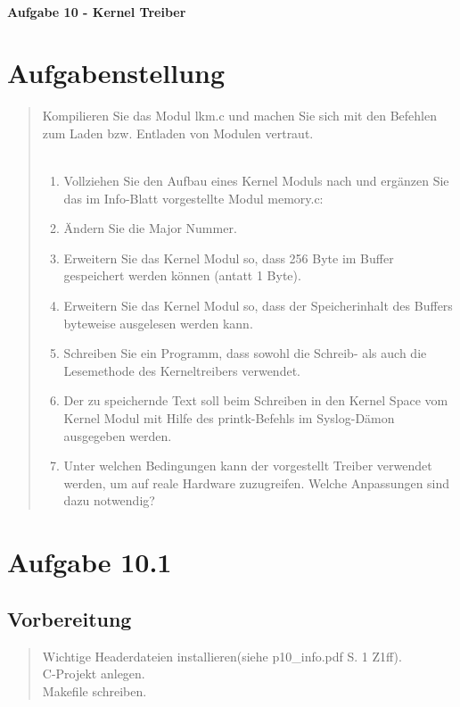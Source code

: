 \newpage

\paragraph{\LARGE Aufgabe 10 - Kernel Treiber}

\section{Aufgabenstellung}
	\begin{quote}
		Kompilieren Sie das Modul lkm.c und machen Sie sich mit den Befehlen zum Laden bzw. Entladen von Modulen vertraut.\\ \\
		\begin{enumerate}
			\item Vollziehen Sie den Aufbau eines Kernel Moduls nach und erg\"anzen Sie das im Info-Blatt vorgestellte Modul memory.c:\\
			\item \"Andern Sie die Major Nummer.\\
			\item Erweitern Sie das Kernel Modul so, dass 256 Byte im Buffer gespeichert werden k\"onnen (antatt 1 Byte).\\
			\item Erweitern Sie das Kernel Modul so, dass der Speicherinhalt des Buffers byteweise ausgelesen werden kann.\\
			\item Schreiben Sie ein Programm, dass sowohl die Schreib- als auch die Lesemethode des Kerneltreibers verwendet.\\
			\item Der zu speichernde Text soll beim Schreiben in den Kernel Space vom Kernel Modul mit Hilfe des printk-Befehls im Syslog-D\"amon ausgegeben werden.\\
			\item Unter welchen Bedingungen kann der vorgestellt Treiber verwendet werden, um auf reale Hardware zuzugreifen. Welche Anpassungen sind dazu notwendig?\\
		\end{enumerate}
	\end{quote}
\newpage
\section{Aufgabe 10.1}
	\subsection{Vorbereitung}
		\begin{quote}
			Wichtige Headerdateien installieren(siehe p10\_info.pdf S. 1 Z1ff).\\
			C-Projekt anlegen.\\
			Makefile schreiben.\\
		\end{quote}
